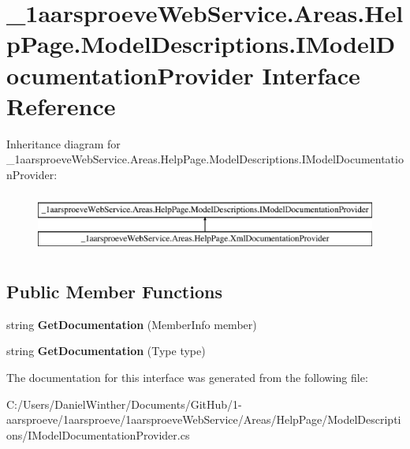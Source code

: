 \hypertarget{interface__1aarsproeve_web_service_1_1_areas_1_1_help_page_1_1_model_descriptions_1_1_i_model_documentation_provider}{}\section{\+\_\+1aarsproeve\+Web\+Service.\+Areas.\+Help\+Page.\+Model\+Descriptions.\+I\+Model\+Documentation\+Provider Interface Reference}
\label{interface__1aarsproeve_web_service_1_1_areas_1_1_help_page_1_1_model_descriptions_1_1_i_model_documentation_provider}
Inheritance diagram for \+\_\+1aarsproeve\+Web\+Service.\+Areas.\+Help\+Page.\+Model\+Descriptions.\+I\+Model\+Documentation\+Provider\+:\begin{figure}[H]
\begin{center}
\leavevmode
\includegraphics[height=2.000000cm]{interface__1aarsproeve_web_service_1_1_areas_1_1_help_page_1_1_model_descriptions_1_1_i_model_documentation_provider}
\end{center}
\end{figure}
\subsection*{Public Member Functions}
\begin{DoxyCompactItemize}
\item 
\hypertarget{interface__1aarsproeve_web_service_1_1_areas_1_1_help_page_1_1_model_descriptions_1_1_i_model_documentation_provider_a2b728d776da74168bd405ae202c11129}{}string {\bfseries Get\+Documentation} (Member\+Info member)\label{interface__1aarsproeve_web_service_1_1_areas_1_1_help_page_1_1_model_descriptions_1_1_i_model_documentation_provider_a2b728d776da74168bd405ae202c11129}

\item 
\hypertarget{interface__1aarsproeve_web_service_1_1_areas_1_1_help_page_1_1_model_descriptions_1_1_i_model_documentation_provider_a0c90877deffb5cdbfb8260caa8ab7411}{}string {\bfseries Get\+Documentation} (Type type)\label{interface__1aarsproeve_web_service_1_1_areas_1_1_help_page_1_1_model_descriptions_1_1_i_model_documentation_provider_a0c90877deffb5cdbfb8260caa8ab7411}

\end{DoxyCompactItemize}


The documentation for this interface was generated from the following file\+:\begin{DoxyCompactItemize}
\item 
C\+:/\+Users/\+Daniel\+Winther/\+Documents/\+Git\+Hub/1-\/aarsproeve/1aarsproeve/1aarsproeve\+Web\+Service/\+Areas/\+Help\+Page/\+Model\+Descriptions/I\+Model\+Documentation\+Provider.\+cs\end{DoxyCompactItemize}
